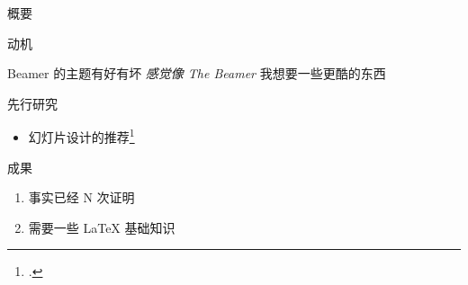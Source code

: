 \begin{frame}{概要}

  \begin{block}{动机}
    \begin{itemize}
      \ngitem Beamer 的主题有好有坏 \emph{感觉像 The Beamer}
      \thusitem 我想要一些更酷的东西
    \end{itemize}
  \end{block}
  
 \begin{block}{先行研究}
   \begin{itemize}
   \item
     幻灯片设计的推荐\footcite{slidedesign}
   \end{itemize}
 \end{block}
  
 \begin{block}{成果}
  \begin{enumerate}
  \item {} 事实已经 N 次证明
  \item 需要一些 \LaTeX{} 基础知识
  \end{enumerate}
 \end{block}
  
\end{frame}
